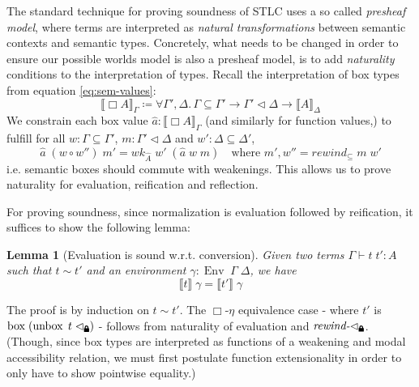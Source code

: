 \documentclass[12pt,twoside,openright]{report}
\numberwithin{equation}{chapter}
\numberwithin{figure}{chapter}
\numberwithin{table}{chapter}
\newtheorem{lemma}[theorem]{Lemma}
\theoremstyle{definition}\newtheorem{definition}{Definition}
\newcommand{\lock}{\text{\tikz[baseline]{
      \fill[rounded corners=.1ex] (-.75ex,0) rectangle (.75ex,1ex);
      \draw[line width=.3ex] (-.4ex,.5ex) -- ++(0,.75ex) arc (180:0:.4ex) -- ++(0,-.75ex);
}}}
\begin{document}
The standard technique for proving soundness of STLC \cite{altenkirch95,kovacs17}
uses a so called \emph{presheaf model},
where terms are interpreted as \emph{natural transformations}
between semantic contexts and semantic types.
Concretely, what needs to be changed in order to ensure
our possible worlds model is also a presheaf model,
is to add \emph{naturality} conditions to the interpretation of types.
Recall the interpretation of box types from equation \eqref{eq:sem-values}:
$$ \llbracket \Box A \rrbracket_\Gamma \coloneqq \forall \Gamma', \Delta. \, \Gamma \subseteq \Gamma' \to \Gamma'\lhd\Delta \to \llbracket A \rrbracket_\Delta $$
We constrain each box value $\hat a : \llbracket \Box A \rrbracket_\Gamma$
(and similarly for function values,)
to fulfill for all $w : \Gamma \subseteq \Gamma'$, $m : \Gamma' \lhd \Delta$ and $w' : \Delta \subseteq \Delta'$,
$$ \hat a \; (w \circ w'') \; m' = \textit{wk}_{\widehat A} \; w' \; (\hat a \; w \; m) \quad \text{where } m' , w'' = \textit{rewind}_\subseteq \; m \; w' $$
i.e. semantic boxes should commute with weakenings.
This allows us to prove naturality for evaluation, reification and reflection.

For proving soundness, since normalization is evaluation followed by reification,
it suffices to show the following lemma:
\begin{lemma}[Evaluation is sound w.r.t. conversion]
  Given two terms $\Gamma \vdash t \; t' : A$ such that $t \sim t'$
  and an environment $\gamma : \operatorname{Env} \; \Gamma \; \Delta$,
  we have
  $$ \llbracket t \rrbracket \; \gamma = \llbracket t' \rrbracket \; \gamma $$
\end{lemma}
The proof is by induction on $t \sim t'$.
The $\Box\text{-}\eta$ equivalence case -
where $t'$ is $\operatorname{box} \; (\operatorname{unbox} \; t \; \lhd_\lock)$ -
follows from naturality of evaluation and $\textit{rewind-}\lhd_\lock$.
(Though, since box types are interpreted as functions
of a weakening and modal accessibility relation,
we must first postulate function extensionality
in order to only have to show pointwise equality.)
\end{document}
